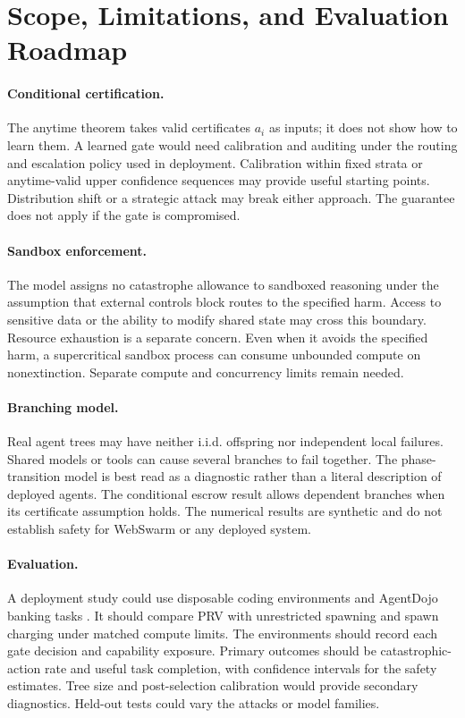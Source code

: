 \documentclass[sigconf,nonacm]{acmart}
\newcommand{\prv}{\textsc{PRV}}
\begin{document}
\section{Scope, Limitations, and Evaluation Roadmap}

\paragraph{Conditional certification.}
The anytime theorem takes valid certificates $a_i$ as inputs; it does not show how to learn them.
A learned gate would need calibration and auditing under the routing and escalation policy used
in deployment.  Calibration within fixed strata or anytime-valid upper confidence sequences may
provide useful starting points.  Distribution shift or a strategic attack may break
either approach.  The guarantee does not apply if the gate is compromised.

\paragraph{Sandbox enforcement.}
The model assigns no catastrophe allowance to sandboxed reasoning under the assumption that
external controls block routes to the specified harm.  Access to sensitive data or the ability
to modify shared state may cross this boundary.  Resource exhaustion is a separate concern.  Even
when it avoids the specified harm, a supercritical sandbox process can consume unbounded compute
on nonextinction.  Separate compute and concurrency limits remain needed.

\paragraph{Branching model.}
Real agent trees may have neither i.i.d. offspring nor independent local failures.  Shared models
or tools can cause several branches to fail together.  The phase-transition model is best read as a
diagnostic rather than a literal description of deployed agents.  The conditional escrow result
allows dependent branches when its certificate assumption holds.  The numerical results are
synthetic and do not establish safety for WebSwarm or any deployed system.

\paragraph{Evaluation.}
A deployment study could use disposable coding environments and AgentDojo banking tasks
\cite{debenedetti2024agentdojo}.  It should compare \prv{} with unrestricted spawning and spawn
charging under matched compute limits.  The environments should record each gate decision and
capability exposure.  Primary outcomes should be catastrophic-action rate and useful task completion,
with confidence intervals for the safety estimates.  Tree size and post-selection calibration
would provide secondary diagnostics.  Held-out tests could vary the attacks or model families.
\end{document}
